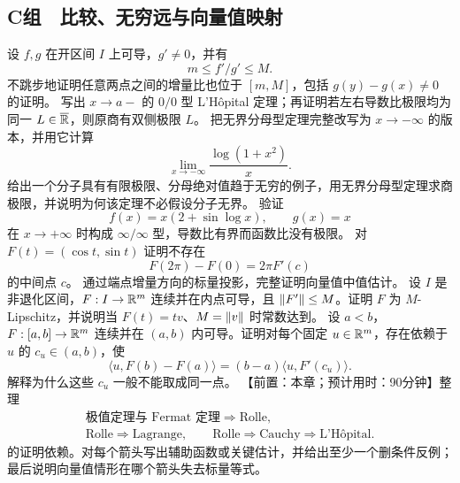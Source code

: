 \subsection*{C组　比较、无穷远与向量值映射}
\begin{enumerate}[label=\textbf{\thechapter.\arabic*.},ref=\thechapter.\arabic*,leftmargin=3.4em,labelsep=0.7em,itemsep=0.85em,topsep=0.8em,resume]
  设 \(f,g\) 在开区间 \(I\) 上可导，\(g'\ne0\)，并有
 \[
  m\le f'/g'\le M.
 \]
 不跳步地证明任意两点之间的增量比也位于 \([m,M]\)，包括 \(g(y)-g(x)\ne0\) 的证明。
  写出 \(x\to a-\) 的 \(0/0\) 型 L'Hôpital 定理；再证明若左右导数比极限均为同一 \(L\in\overline{\mathbb{R}}\)，则原商有双侧极限 \(L\)。
  把无界分母型定理完整改写为 \(x\to-\infty\) 的版本，并用它计算
 \[
  \lim_{x\to-\infty}\frac{\log(1+x^2)}{x}.
 \]
  给出一个分子具有有限极限、分母绝对值趋于无穷的例子，用无界分母型定理求商极限，并说明为何该定理不必假设分子无界。
  验证
 \[
  f(x)=x(2+\sin\log x),\qquad g(x)=x
 \]
 在 \(x\to+\infty\) 时构成 \(\infty/\infty\) 型，导数比有界而函数比没有极限。
  对 \(F(t)=(\cos t,\sin t)\) 证明不存在
 \[
  F(2\pi)-F(0)=2\pi F'(c)
 \]
 的中间点 \(c\)。
  通过端点增量方向的标量投影，完整证明向量值中值估计。
  设 \(I\) 是非退化区间，\(F:I\to\mathbb{R}^m\) 连续并在内点可导，且 \(\left\lVert F'\right\rVert\le M\)。证明 \(F\) 为 \(M\)-Lipschitz，并说明当 \(F(t)=tv\)、\(M=\left\lVert v\right\rVert\) 时常数达到。
  设 \(a<b\)，\(F:[a,b]\to\mathbb{R}^m\) 连续并在 \((a,b)\) 内可导。证明对每个固定 \(u\in\mathbb{R}^m\)，存在依赖于 \(u\) 的 \(c_u\in(a,b)\)，使
 \[
  \langle u,F(b)-F(a)\rangle
  =(b-a)\langle u,F'(c_u)\rangle.
 \]
 解释为什么这些 \(c_u\) 一般不能取成同一点。
  【前置：本章；预计用时：90分钟】整理
 \[
  \begin{gathered}
  \text{极值定理与 Fermat 定理}\Longrightarrow\text{Rolle},\\
  \text{Rolle}\Longrightarrow\text{Lagrange},\qquad
  \text{Rolle}\Longrightarrow\text{Cauchy}\Longrightarrow\text{L'Hôpital}.
  \end{gathered}
 \]
 的证明依赖。对每个箭头写出辅助函数或关键估计，并给出至少一个删条件反例；最后说明向量值情形在哪个箭头失去标量等式。
\end{enumerate}
